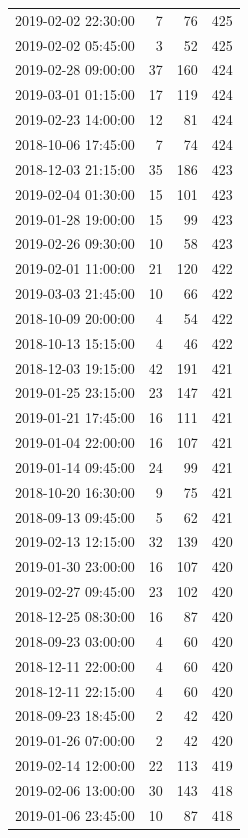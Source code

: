 \begin{tabular}{lrrr}
2019-02-02 22:30:00 & 7 & 76 & 425 \\
2019-02-02 05:45:00 & 3 & 52 & 425 \\
2019-02-28 09:00:00 & 37 & 160 & 424 \\
2019-03-01 01:15:00 & 17 & 119 & 424 \\
2019-02-23 14:00:00 & 12 & 81 & 424 \\
2018-10-06 17:45:00 & 7 & 74 & 424 \\
2018-12-03 21:15:00 & 35 & 186 & 423 \\
2019-02-04 01:30:00 & 15 & 101 & 423 \\
2019-01-28 19:00:00 & 15 & 99 & 423 \\
2019-02-26 09:30:00 & 10 & 58 & 423 \\
2019-02-01 11:00:00 & 21 & 120 & 422 \\
2019-03-03 21:45:00 & 10 & 66 & 422 \\
2018-10-09 20:00:00 & 4 & 54 & 422 \\
2018-10-13 15:15:00 & 4 & 46 & 422 \\
2018-12-03 19:15:00 & 42 & 191 & 421 \\
2019-01-25 23:15:00 & 23 & 147 & 421 \\
2019-01-21 17:45:00 & 16 & 111 & 421 \\
2019-01-04 22:00:00 & 16 & 107 & 421 \\
2019-01-14 09:45:00 & 24 & 99 & 421 \\
2018-10-20 16:30:00 & 9 & 75 & 421 \\
2018-09-13 09:45:00 & 5 & 62 & 421 \\
2019-02-13 12:15:00 & 32 & 139 & 420 \\
2019-01-30 23:00:00 & 16 & 107 & 420 \\
2019-02-27 09:45:00 & 23 & 102 & 420 \\
2018-12-25 08:30:00 & 16 & 87 & 420 \\
2018-09-23 03:00:00 & 4 & 60 & 420 \\
2018-12-11 22:00:00 & 4 & 60 & 420 \\
2018-12-11 22:15:00 & 4 & 60 & 420 \\
2018-09-23 18:45:00 & 2 & 42 & 420 \\
2019-01-26 07:00:00 & 2 & 42 & 420 \\
2019-02-14 12:00:00 & 22 & 113 & 419 \\
2019-02-06 13:00:00 & 30 & 143 & 418 \\
2019-01-06 23:45:00 & 10 & 87 & 418 \\

\end{tabular}
